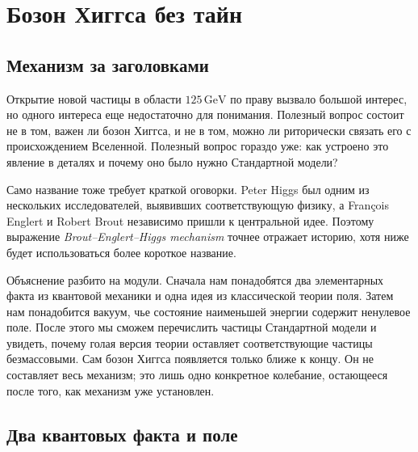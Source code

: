 \chapter{Бозон Хиггса без тайн}


\section{Механизм за заголовками}

Открытие новой частицы в области $125\,\mathrm{GeV}$ по праву вызвало большой интерес, но одного интереса еще недостаточно для понимания. Полезный вопрос состоит не в том, важен ли бозон Хиггса, и не в том, можно ли риторически связать его с происхождением Вселенной. Полезный вопрос гораздо уже: как устроено это явление в деталях и почему оно было нужно Стандартной модели?

Само название тоже требует краткой оговорки. Peter Higgs был одним из нескольких исследователей, выявивших соответствующую физику, а Fran\c{c}ois Englert и Robert Brout независимо пришли к центральной идее. Поэтому выражение \emph{Brout--Englert--Higgs mechanism} точнее отражает историю, хотя ниже будет использоваться более короткое название.

Объяснение разбито на модули. Сначала нам понадобятся два элементарных факта из квантовой механики и одна идея из классической теории поля. Затем нам понадобится вакуум, чье состояние наименьшей энергии содержит ненулевое поле. После этого мы сможем перечислить частицы Стандартной модели и увидеть, почему голая версия теории оставляет соответствующие частицы безмассовыми. Сам бозон Хиггса появляется только ближе к концу. Он не составляет весь механизм; это лишь одно конкретное колебание, остающееся после того, как механизм уже установлен.

\section{Два квантовых факта и поле}

